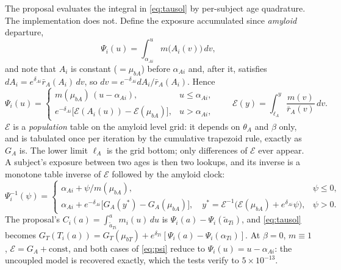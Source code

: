 \documentclass[11pt]{article}
\newcommand{\rbar}{\bar r}
\newcommand{\E}{\mathcal{E}}
\begin{document}
The proposal evaluates the integral in \eqref{eq:tausol} by per-subject age
quadrature. The implementation does not. Define the exposure accumulated since
\emph{amyloid} departure,
\[
\Psi_i(u)=\int_{\alpha_{Ai}}^{u} m\!\big(A_i(v)\big)\,dv ,
\]
and note that $A_i$ is constant ($=\mu_{bA}$) before $\alpha_{Ai}$ and, after it,
satisfies $dA_i=e^{\delta_{Ai}}\rbar_A(A_i)\,dv$, so $dv=e^{-\delta_{Ai}}dA_i/\rbar_A(A_i)$.
Hence
\begin{equation}
\Psi_i(u)=\begin{cases}
m(\mu_{bA})\,(u-\alpha_{Ai}), & u\le\alpha_{Ai},\\[3pt]
e^{-\delta_{Ai}}\big[\E(A_i(u))-\E(\mu_{bA})\big], & u>\alpha_{Ai},
\end{cases}
\qquad
\E(y)=\int_{\ell_A}^{y}\frac{m(v)}{\rbar_A(v)}\,dv .
\label{eq:psi}
\end{equation}
$\E$ is a \emph{population} table on the amyloid level grid: it depends on
$\theta_A$ and $\beta$ only, and is tabulated once per iteration by the
cumulative trapezoid rule, exactly as $G_A$ is. The lower limit $\ell_A$ is the
grid bottom; only differences of $\E$ ever appear. A subject's exposure between
two ages is then two lookups, and its inverse is a monotone table inverse of
$\E$ followed by the amyloid clock:
\begin{equation}
\Psi_i^{-1}(\psi)=\begin{cases}
\alpha_{Ai}+\psi/m(\mu_{bA}), & \psi\le0,\\[3pt]
\alpha_{Ai}+e^{-\delta_{Ai}}\big[G_A(y^\ast)-G_A(\mu_{bA})\big],\quad
y^\ast=\E^{-1}\!\big(\E(\mu_{bA})+e^{\delta_{Ai}}\psi\big), & \psi>0 .
\end{cases}
\label{eq:psiinv}
\end{equation}
The proposal's $C_i(a)=\int_{\tilde a_{Ti}}^{a}m_i(u)\,du$ is
$\Psi_i(a)-\Psi_i(\tilde a_{Ti})$, and
\eqref{eq:tausol} becomes $G_T(T_i(a))=G_T(\mu_{bT})+e^{\delta_{Ti}}[\Psi_i(a)-\Psi_i(\alpha_{Ti})]$.
At $\beta=0$, $m\equiv1$, $\E=G_A+\text{const}$, and both cases of \eqref{eq:psi}
reduce to $\Psi_i(u)=u-\alpha_{Ai}$: the uncoupled model is recovered exactly, which
the tests verify to $5\times10^{-13}$.
\end{document}

